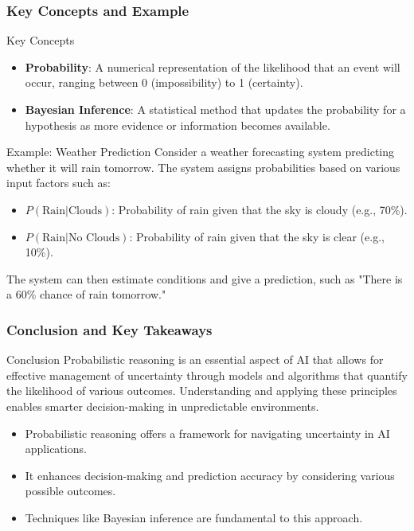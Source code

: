 \documentclass[aspectratio=169]{beamer}
\begin{document}
\begin{frame}[fragile]
    \frametitle{Key Concepts and Example}
    \begin{block}{Key Concepts}
        \begin{itemize}
            \item \textbf{Probability}:
                A numerical representation of the likelihood that an event will occur, ranging between 0 (impossibility) to 1 (certainty).

            \item \textbf{Bayesian Inference}:
                A statistical method that updates the probability for a hypothesis as more evidence or information becomes available.
        \end{itemize}
    \end{block}
    
    \begin{block}{Example: Weather Prediction}
        Consider a weather forecasting system predicting whether it will rain tomorrow. The system assigns probabilities based 
        on various input factors such as:
        \begin{itemize}
            \item $P(\text{Rain} | \text{Clouds})$: Probability of rain given that the sky is cloudy (e.g., 70\%).
            \item $P(\text{Rain} | \text{No Clouds})$: Probability of rain given that the sky is clear (e.g., 10\%).
        \end{itemize}
        The system can then estimate conditions and give a prediction, such as "There is a 60\% chance of rain tomorrow."
    \end{block}
\end{frame}

\begin{frame}[fragile]
    \frametitle{Conclusion and Key Takeaways}
    \begin{block}{Conclusion}
        Probabilistic reasoning is an essential aspect of AI that allows for effective management of uncertainty through models and algorithms 
        that quantify the likelihood of various outcomes. Understanding and applying these principles enables smarter decision-making 
        in unpredictable environments.
    \end{block}
    
    \begin{itemize}
        \item Probabilistic reasoning offers a framework for navigating uncertainty in AI applications.
        \item It enhances decision-making and prediction accuracy by considering various possible outcomes.
        \item Techniques like Bayesian inference are fundamental to this approach.
    \end{itemize}
\end{frame}
\end{document}

